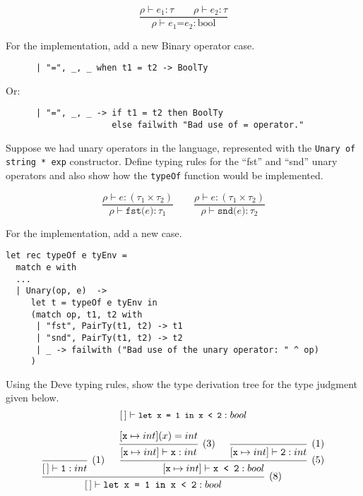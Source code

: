 \documentclass[addpoints]{exam}
\newcommand{\TJDG}[3]{#1 \vdash #2 : #3}
\begin{document}
\begin{questions}
  \begin{solutionbox}{5cm}
    \[
    \frac{\TJDG{\rho}{e_1}{\tau} \qquad \TJDG{\rho}{e_2}{\tau}}
         {\TJDG{\rho}{\texttt{$e_1$=$e_2$}}{\mathrm{bool}}}
    \]

    For the implementation, add a new Binary operator case.

    \begin{verbatim}
      | "=", _, _ when t1 = t2 -> BoolTy
    \end{verbatim}

    Or:

    \begin{verbatim}
      | "=", _, _ -> if t1 = t2 then BoolTy
                     else failwith "Bad use of = operator."
    \end{verbatim}
  \end{solutionbox}

  \question
  Suppose we had unary operators in the language,
  represented with the \texttt{Unary of string * exp}
  constructor.
  Define typing rules for the ``fst'' and ``snd'' unary operators and
  also show how the \texttt{typeOf} function would be implemented.

  \begin{solutionbox}{7cm}
    \[
    \frac{\TJDG{\rho}{e}{(\tau_1\times\tau_2)}}
         {\TJDG{\rho}{\texttt{fst($e$)}}{\tau_1}}
    \qquad
    \frac{\TJDG{\rho}{e}{(\tau_1\times\tau_2)}}
         {\TJDG{\rho}{\texttt{snd($e$)}}{\tau_2}}
    \]

    For the implementation, add a new case.

    \begin{verbatim}
let rec typeOf e tyEnv =
  match e with
  ...
  | Unary(op, e)  ->
     let t = typeOf e tyEnv in
     (match op, t1, t2 with
      | "fst", PairTy(t1, t2) -> t1
      | "snd", PairTy(t1, t2) -> t2
      | _ -> failwith ("Bad use of the unary operator: " ^ op)
     )
    \end{verbatim}
  \end{solutionbox}

  \question
  Using the Deve typing rules,
  show the type derivation tree for the type judgment
  given below.
  \[
  \small
  \TJDG{[\,]}{\texttt{let x = 1 in x < 2}}{bool} 
  \]

  \begin{solutionbox}{3cm}
    \[
    \begin{prooftree}
        \infer0[(1)]{\TJDG{[\,]}{\texttt{1}}{int}}
            \hypo{[\texttt{x}\mapsto int](x) = int}
          \infer1[(3)]{\TJDG{[\texttt{x}\mapsto int]}{\texttt{x}}{int}}
          \infer0[(1)]{\TJDG{[\texttt{x}\mapsto int]}{\texttt{2}}{int}}
        \infer2[(5)]{\TJDG{[\texttt{x}\mapsto int]}{\texttt{x < 2}}{bool}}
      \infer2[(8)]{\TJDG{[\,]}{\texttt{let x = 1 in x < 2}}{bool}}
    \end{prooftree}
    \]
  \end{solutionbox}


\end{questions}
\end{document}
